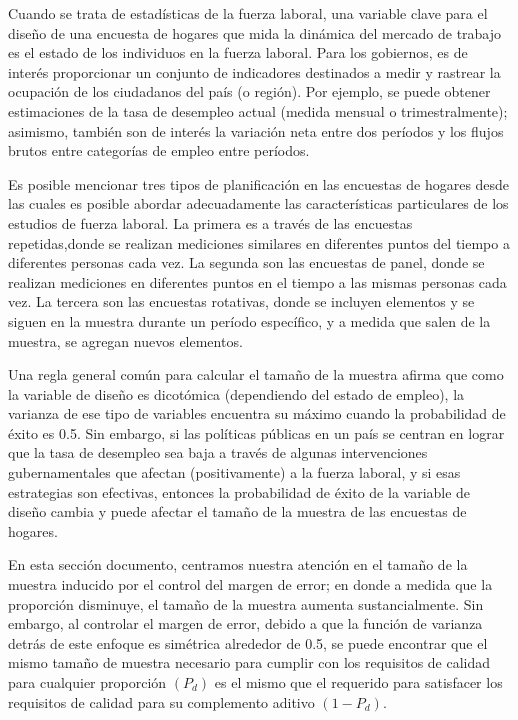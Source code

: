 \documentclass[
  12pt,
  spanish,
]{book}
\begin{document}
Cuando se trata de estadísticas de la fuerza laboral, una variable clave para el diseño de una encuesta de hogares que mida la dinámica del mercado de trabajo es el estado de los individuos en la fuerza laboral. Para los gobiernos, es de interés proporcionar un conjunto de indicadores destinados a medir y rastrear la ocupación de los ciudadanos del país (o región). Por ejemplo, se puede obtener estimaciones de la tasa de desempleo actual (medida mensual o trimestralmente); asimismo, también son de interés la variación neta entre dos períodos y los flujos brutos entre categorías de empleo entre períodos.

Es posible mencionar tres tipos de planificación en las encuestas de hogares desde las cuales es posible abordar adecuadamente las características particulares de los estudios de fuerza laboral. La primera es a través de las encuestas repetidas,donde se realizan mediciones similares en diferentes puntos del tiempo a diferentes personas cada vez. La segunda son las encuestas de panel, donde se realizan mediciones en diferentes puntos en el tiempo a las mismas personas cada vez. La tercera son las encuestas rotativas, donde se incluyen elementos y se siguen en la muestra durante un período específico, y a medida que salen de la muestra, se agregan nuevos elementos.

Una regla general común para calcular el tamaño de la muestra afirma que como la variable de diseño es dicotómica (dependiendo del estado de empleo), la varianza de ese tipo de variables encuentra su máximo cuando la probabilidad de éxito es 0.5. Sin embargo, si las políticas públicas en un país se centran en lograr que la tasa de desempleo sea baja a través de algunas intervenciones gubernamentales que afectan (positivamente) a la fuerza laboral, y si esas estrategias son efectivas, entonces la probabilidad de éxito de la variable de diseño cambia y puede afectar el tamaño de la muestra de las encuestas de hogares.

En esta sección documento, centramos nuestra atención en el tamaño de la muestra inducido por el control del margen de error; en donde a medida que la proporción disminuye, el tamaño de la muestra aumenta sustancialmente. Sin embargo, al controlar el margen de error, debido a que la función de varianza detrás de este enfoque es simétrica alrededor de 0.5, se puede encontrar que el mismo tamaño de muestra necesario para cumplir con los requisitos de calidad para cualquier proporción \((P_d)\) es el mismo que el requerido para satisfacer los requisitos de calidad para su complemento aditivo \((1 - P_d)\).
\end{document}
